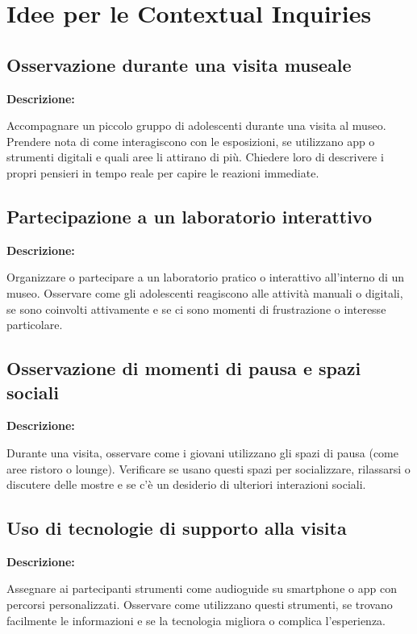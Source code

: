 \documentclass{article}
\begin{document}
\section{Idee per le Contextual Inquiries}

\subsection{Osservazione durante una visita museale}

\textbf{Descrizione:}

Accompagnare un piccolo gruppo di adolescenti durante una visita al museo. Prendere nota di come interagiscono con le esposizioni, se utilizzano app o strumenti digitali e quali aree li attirano di più. Chiedere loro di descrivere i propri pensieri in tempo reale per capire le reazioni immediate.

\subsection{Partecipazione a un laboratorio interattivo}

\textbf{Descrizione:}

Organizzare o partecipare a un laboratorio pratico o interattivo all’interno di un museo. Osservare come gli adolescenti reagiscono alle attività manuali o digitali, se sono coinvolti attivamente e se ci sono momenti di frustrazione o interesse particolare.

\subsection{Osservazione di momenti di pausa e spazi sociali}

\textbf{Descrizione:}

Durante una visita, osservare come i giovani utilizzano gli spazi di pausa (come aree ristoro o lounge). Verificare se usano questi spazi per socializzare, rilassarsi o discutere delle mostre e se c’è un desiderio di ulteriori interazioni sociali.

\subsection{Uso di tecnologie di supporto alla visita}

\textbf{Descrizione:}

Assegnare ai partecipanti strumenti come audioguide su smartphone o app con percorsi personalizzati. Osservare come utilizzano questi strumenti, se trovano facilmente le informazioni e se la tecnologia migliora o complica l’esperienza.
\end{document}
